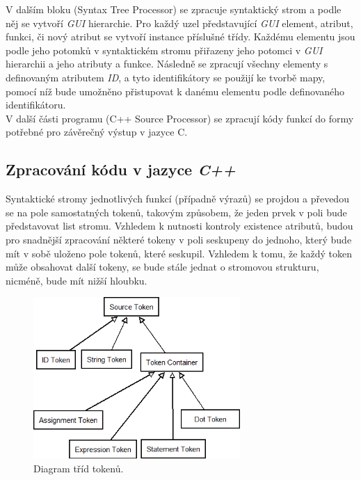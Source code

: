 \documentclass[11pt,twoside,a4paper]{book}
\begin{document}
{{\begin{ttemize}
{{V dalším bloku (Syntax Tree Processor) se zpracuje syntaktický strom a podle něj se vytvoří \textit{GUI} hierarchie. Pro každý uzel představující \textit{GUI} element, atribut, funkci, či nový atribut se vytvoří instance příslušné třídy. Každému elementu jsou podle jeho potomků v syntaktickém stromu přiřazeny jeho potomci v \textit{GUI} hierarchii a jeho atributy a funkce.
Následně se zpracují všechny elementy s definovaným atributem \textit{ID}, a tyto identifikátory se použijí ke tvorbě mapy, pomocí níž bude umožněno přistupovat k danému elementu podle definovaného identifikátoru.\\
V další části programu (C++ Source Processor) se zpracují kódy funkcí do formy potřebné pro závěrečný výstup v jazyce C. 

\subsection{Zpracování kódu v jazyce \textit{C++}}
Syntaktické stromy jednotlivých funkcí (případně výrazů) se projdou a převedou se na pole samostatných tokenů, takovým způsobem, že jeden prvek v poli bude představovat list stromu. Vzhledem k nutnosti kontroly existence atributů, budou pro snadnější zpracování některé tokeny v poli seskupeny do jednoho, který bude mít v sobě uloženo pole tokenů, které seskupil. Vzhledem k tomu, že každý token může obsahovat další tokeny, se bude stále jednat o stromovou strukturu, nicméně, bude mít nižší hloubku.\\
\begin{figure}[!ht]
\begin{center}
  \includegraphics[width=0.7\textwidth]{tokens}
\caption{{\label{fig:fig2}}Diagram tříd tokenů.}
\end{center}
\end{figure}

}}
\end{ttemize}}}
\end{document}
